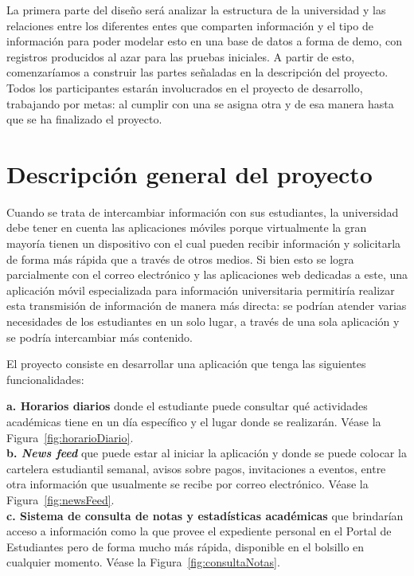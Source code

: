 \documentclass[12pt]{article}
\begin{document}
La primera parte del diseño será analizar la estructura de la universidad y las relaciones entre los diferentes entes que comparten información y el tipo de información para poder modelar esto en una base de datos a forma de demo, con registros producidos al azar para las pruebas iniciales. A partir de esto, comenzaríamos a construir las partes señaladas en la descripción del proyecto. Todos los participantes estarán involucrados en el proyecto de desarrollo, trabajando por metas: al cumplir con una se asigna otra y de esa manera hasta que se ha finalizado el proyecto.


\section{Descripción general del proyecto}

Cuando se trata de intercambiar información con sus estudiantes, la universidad debe tener en cuenta las aplicaciones móviles porque virtualmente la gran mayor\'ia tienen un dispositivo con el cual pueden recibir información y solicitarla de forma más rápida que a través de otros medios. Si bien esto se logra parcialmente con el correo electrónico y las aplicaciones web dedicadas a este, una aplicación m\'ovil especializada para información universitaria permitiría realizar esta transmisi\'on de informaci\'on de manera más directa: se podrían atender varias necesidades de los estudiantes en un solo lugar, a través de una sola aplicación y se podría intercambiar más contenido.

\newpage

El proyecto consiste en desarrollar una aplicación que tenga las siguientes funcionalidades:

\textbf{a. Horarios diarios} donde el estudiante puede consultar qué actividades académicas tiene en un día específico y el lugar donde se realizarán. Véase la Figura~\ref{fig:horarioDiario}.\\

\textbf{b. \textit{News feed}} que puede estar al iniciar la aplicación y donde se puede colocar la cartelera estudiantil semanal, avisos sobre pagos, invitaciones a eventos, entre otra información que usualmente se recibe por correo electrónico. Véase la Figura~\ref{fig:newsFeed}.\\

\textbf{c. Sistema de consulta de notas y estadísticas académicas } que brindarían acceso a información como la que provee el expediente personal en el Portal de Estudiantes pero de forma mucho más rápida, disponible en el bolsillo en cualquier momento. Véase la Figura~\ref{fig:consultaNotas}.\\
\end{document}
